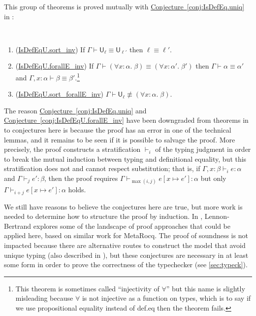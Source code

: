 \documentclass[sigplan,10pt,screen]{acmart}\settopmatter{printfolios=true,printccs=false,printacmref=false}
\newcommand{\U}{\mathsf{U}}
\newcommand{\code}[1]{\mbox{\ttfamily\small #1}}
\newcommand{\sref}[2]{\hyperref[#2]{#1~\ref{#2}}}
\begin{document}
\noindent This group of theorems is proved mutually with \sref{Conjecture}{conj:IsDefEq.uniq} in \cite{leantt}:
\begin{conjecture}\label{conj:IsDefEqU.forallE_inv}\ %
  \begin{enumerate}
    \item (\href{https://github.com/digama0/lean4lean/blob/cpp2026/Lean4Lean/Theory/Typing/UniqueTyping.lean#L73-L74}{\code{IsDefEqU.sort\_inv}}) If $\Gamma\vdash \U_\ell\equiv\U_{\ell'}$ then $\ell\equiv \ell'$.
    \item (\href{https://github.com/digama0/lean4lean/blob/cpp2026/Lean4Lean/Theory/Typing/UniqueTyping.lean#L76-L78}{\code{IsDefEqU.forallE\_inv}}) If $\Gamma\vdash (\forall x:\alpha.\;\beta)\equiv(\forall x:\alpha'.\;\beta')$ then $\Gamma\vdash\alpha\equiv \alpha'$ and $\Gamma,x:\alpha\vdash\beta\equiv \beta'$.\footnote{This theorem is sometimes called ``injectivity of $\forall$'' but this name is slightly misleading because $\forall$ is not injective as a function on types, which is to say if we use propositional equality instead of def.eq then the theorem fails.}
    \item (\href{https://github.com/digama0/lean4lean/blob/cpp2026/Lean4Lean/Theory/Typing/UniqueTyping.lean#L80-L81}{\code{IsDefEqU.sort\_forallE\_inv}}) $\Gamma\vdash \U_\ell\not\equiv(\forall x:\alpha.\;\beta)$.
  \end{enumerate}
\end{conjecture}

The reason \sref{Conjecture}{conj:IsDefEq.uniq} and \sref{Conjecture}{conj:IsDefEqU.forallE_inv} have been downgraded from theorems in \cite{leantt} to conjectures here is because the proof has an error in one of the technical lemmas, and it remains to be seen if it is possible to salvage the proof. More precisely, the proof constructs a stratification $\vdash_i$ of the typing judgment in order to break the mutual induction between typing and definitional equality, but this stratification does not and cannot respect substitution; that is, if $\Gamma,x:\beta\vdash_i e:\alpha$ and $\Gamma\vdash_j e':\beta$, then the proof requires $\Gamma\vdash_{\max(i,j)} e[x\mapsto e']:\alpha$ but only $\Gamma\vdash_{i+j} e[x\mapsto e']:\alpha$ holds.

We still have reasons to believe the conjectures here are true, but more work is needed to determine how to structure the proof by induction. In \cite{lennonbertrand2025}, Lennon-Bertrand explores some of the landscape of proof approaches that could be applied here, based on similar work for MetaRocq. The proof of soundness is not impacted because there are alternative routes to construct the model that avoid unique typing (also described in \cite{leantt}), but these conjectures are necessary in at least some form in order to prove the correctness of the typechecker (see \autoref{sec:typeck}).
\end{document}
